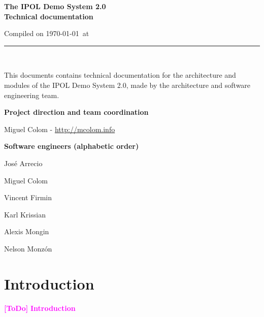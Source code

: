 \documentclass[a4paper,12pt]{article}
\newcommand{\ToDo}[1]{\textcolor{magenta}{\textbf{[ToDo]} \textbf{#1}}}
\begin{document}
\begin{titlepage}

\begin{center}
\vspace*{-1in}

\vspace*{0.6in}
\begin{Large}
\textbf{The IPOL Demo System 2.0 \\Technical documentation} \\
\end{Large}

\vspace*{0.6in}

\small{Compiled on \today\ at \currenttime}

\vspace*{0.6in}
\rule{80mm}{0.1mm}\\
\vspace*{0.1in}
\end{center}

\end{titlepage}

This documents contains technical documentation for the architecture and modules of the IPOL Demo System 2.0, made by the architecture and software engineering team.
\vspace*{0.6in}

\textbf{Project direction and team coordination}

Miguel Colom - \url{http://mcolom.info}

\vspace*{0.2in}

\textbf{Software engineers (alphabetic order)}

José Arrecio

Miguel Colom

Vincent Firmin

Karl Krissian

Alexis Mongin

Nelson Monzón


\newpage

\tableofcontents
\newpage
\listoffigures
\newpage

\section{Introduction}
\ToDo{Introduction}
\end{document}
